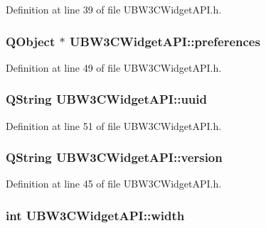 Definition at line 39 of file U\-B\-W3\-C\-Widget\-A\-P\-I.\-h.

\hypertarget{class_u_b_w3_c_widget_a_p_i_a47520f530b1ee8b58bba5b33ee06d352}{
\subsubsection[{preferences}]{\setlength{\rightskip}{0pt plus 5cm}Q\-Object $\ast$ U\-B\-W3\-C\-Widget\-A\-P\-I\-::preferences\hspace{0.3cm}{\ttfamily [read]}}}\label{da/d8c/class_u_b_w3_c_widget_a_p_i_a47520f530b1ee8b58bba5b33ee06d352}


Definition at line 49 of file U\-B\-W3\-C\-Widget\-A\-P\-I.\-h.

\hypertarget{class_u_b_w3_c_widget_a_p_i_ae1f63491c93d254f18a642912e854963}{
\subsubsection[{uuid}]{\setlength{\rightskip}{0pt plus 5cm}Q\-String U\-B\-W3\-C\-Widget\-A\-P\-I\-::uuid\hspace{0.3cm}{\ttfamily [read]}}}\label{da/d8c/class_u_b_w3_c_widget_a_p_i_ae1f63491c93d254f18a642912e854963}


Definition at line 51 of file U\-B\-W3\-C\-Widget\-A\-P\-I.\-h.

\hypertarget{class_u_b_w3_c_widget_a_p_i_a7147a7426ccf7fb7672d62b819253f1d}{
\subsubsection[{version}]{\setlength{\rightskip}{0pt plus 5cm}Q\-String U\-B\-W3\-C\-Widget\-A\-P\-I\-::version\hspace{0.3cm}{\ttfamily [read]}}}\label{da/d8c/class_u_b_w3_c_widget_a_p_i_a7147a7426ccf7fb7672d62b819253f1d}


Definition at line 45 of file U\-B\-W3\-C\-Widget\-A\-P\-I.\-h.

\hypertarget{class_u_b_w3_c_widget_a_p_i_a13da541047433b72303ad1315cffb8e2}{
\subsubsection[{width}]{\setlength{\rightskip}{0pt plus 5cm}int U\-B\-W3\-C\-Widget\-A\-P\-I\-::width\hspace{0.3cm}{\ttfamily [read]}}}\label{da/d8c/class_u_b_w3_c_widget_a_p_i_a13da541047433b72303ad1315cffb8e2}


